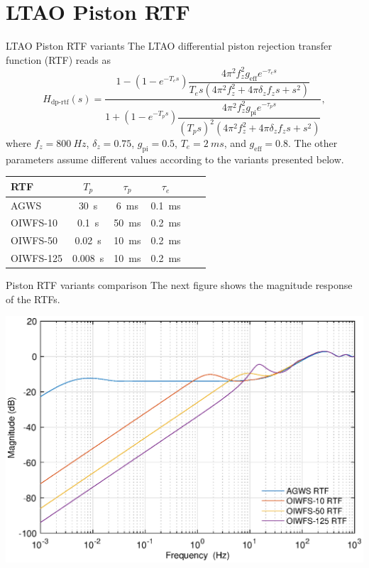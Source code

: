 \documentclass[10pt]{beamer}
\begin{document}
\section{LTAO Piston RTF}
\begin{frame}{LTAO Piston RTF variants}
  The LTAO differential piston rejection transfer function (RTF) reads as
  $$
    H_\text{dp-rtf}(s) = \frac{1 - \left(1 -e^{-T_e s}\right)\dfrac{4\pi^2 f_z^2 g_\text{eff} e^{-\tau_e s} }{T_e s \left(4\pi^2 f_z^2 + 4\pi \delta_z f_z s + s^2\right)}}
    {1 +\left(1 -e^{-T_p s}\right)\dfrac{4\pi^2 f_z^2 g_\text{pi} e^{-\tau_p s} }{\left(T_p s\right)^2 \left(4\pi^2 f_z^2 + 4\pi \delta_z f_z s + s^2\right)}} ,
  $$
where $f_z=\SI{800}{Hz}$, $\delta_z=0.75$, $g_\text{pi}=0.5$, $T_e=\SI{2}{ms}$, and $g_\text{eff}=0.8$. The other parameters assume different values according to the variants presented below.
  \begin{center}
  \begin{tabular}{l|ccccc}
  RTF & $T_p$ & $\tau_p$ & $\tau_e$ \\ \hline
  AGWS & \SI{30}{s} & \SI{6}{ms} & \SI{0.1}{ms}\\
  OIWFS-10 & \SI{0.1}{s} & \SI{50}{ms} & \SI{0.2}{ms}\\
  OIWFS-50 & \SI{0.02}{s} & \SI{10}{ms} & \SI{0.2}{ms}\\
  OIWFS-125 & \SI{0.008}{s} & \SI{10}{ms} & \SI{0.2}{ms}
  \end{tabular}  
  \end{center}
  
\end{frame}



\begin{frame}{Piston RTF variants comparison}
  The next figure shows the magnitude response of the RTFs.
  \begin{center}
  \includegraphics[width=\textwidth]{rtf_variants.eps}      
  \end{center}
\vfill
\end{frame}
\end{document}
